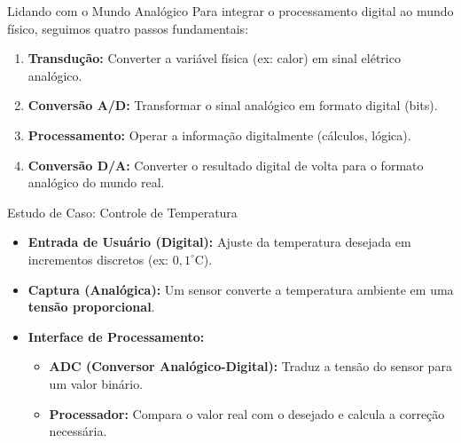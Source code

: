\begin{frame}{Lidando com o Mundo Analógico}
    Para integrar o processamento digital ao mundo físico, seguimos quatro passos fundamentais:
    \begin{enumerate}
        \item \textbf{Transdução:} Converter a variável física (ex: calor) em sinal elétrico analógico.
        \item \textbf{Conversão A/D:} Transformar o sinal analógico em formato digital (bits).
        \item \textbf{Processamento:} Operar a informação digitalmente (cálculos, lógica).
        \item \textbf{Conversão D/A:} Converter o resultado digital de volta para o formato analógico do mundo real.
    \end{enumerate}

\end{frame}

\begin{frame}{Estudo de Caso: Controle de Temperatura}
    \begin{itemize}
        \item \textbf{Entrada de Usuário (Digital):} Ajuste da temperatura desejada em incrementos discretos (ex: $0,1^{\circ}\text{C}$).
        \item \textbf{Captura (Analógica):} Um sensor converte a temperatura ambiente em uma \textbf{tensão proporcional}.
        \item \textbf{Interface de Processamento:}
              \begin{itemize}
                  \item \textbf{ADC (Conversor Analógico-Digital):} Traduz a tensão do sensor para um valor binário.
                  \item \textbf{Processador:} Compara o valor real com o desejado e calcula a correção necessária.
              \end{itemize}
    \end{itemize}

\end{frame}


